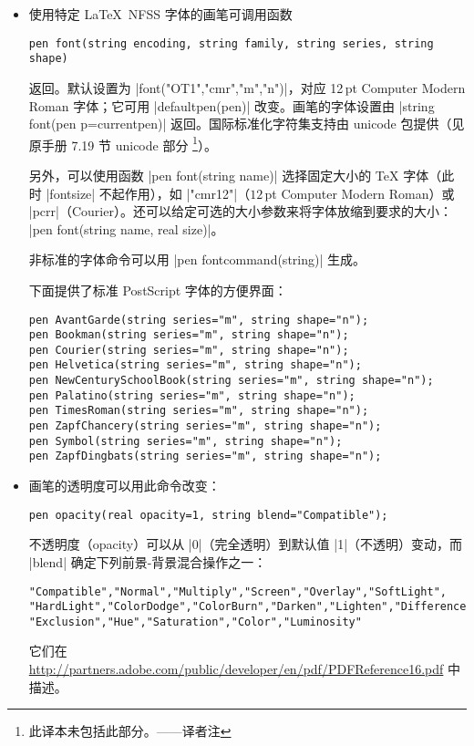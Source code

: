 \documentclass[nofonts,CJKnormalspaces]{ctexbook}[2009/05/20]
\newcommand*\prgname[1]{\textsf{#1}}
\newcommand\transnote[1]{\footnote{#1——译者注}}
\begin{document}
\begin{itemize}
\item 使用特定 \LaTeX\ NFSS 字体的画笔可调用函数
\begin{lstlisting}
pen font(string encoding, string family, string series, string shape)
\end{lstlisting}
  返回。默认设置为 |font("OT1","cmr","m","n")|，对应 12\,pt Computer Modern
  Roman 字体；它可用 |defaultpen(pen)| 改变。画笔的字体设置由
  |string font(pen p=currentpen)| 返回。国际标准化字符集支持由
  \prgname{unicode} 包提供（见原手册 7.19 节 \prgname{unicode} 部分%
  \transnote{此译本未包括此部分。}）。

  另外，可以使用函数 |pen font(string name)| 选择固定大小的 \TeX{} 字体（此时
  |fontsize| 不起作用），如 |"cmr12"|（$12$\,pt Computer Modern Roman）或
  |pcrr|（Courier）。还可以给定可选的大小参数来将字体放缩到要求的大小：
  |pen font(string name, real size)|。

  非标准的字体命令可以用 |pen fontcommand(string)| 生成。

  \index{PostScript 字体@\prgname{PostScript} 字体}
  下面提供了标准 \prgname{PostScript} 字体的方便界面：
\begin{lstlisting}
pen AvantGarde(string series="m", string shape="n");
pen Bookman(string series="m", string shape="n");
pen Courier(string series="m", string shape="n");
pen Helvetica(string series="m", string shape="n");
pen NewCenturySchoolBook(string series="m", string shape="n");
pen Palatino(string series="m", string shape="n");
pen TimesRoman(string series="m", string shape="n");
pen ZapfChancery(string series="m", string shape="n");
pen Symbol(string series="m", string shape="n");
pen ZapfDingbats(string series="m", string shape="n");
\end{lstlisting}

\item 画笔的透明度可以用此命令改变：
\begin{lstlisting}
pen opacity(real opacity=1, string blend="Compatible");
\end{lstlisting}
  不透明度（opacity）可以从 |0|（完全透明）到默认值 |1|（不透明）变动，而
  |blend| 确定下列前景-背景混合操作之一：
\begin{lstlisting}
"Compatible","Normal","Multiply","Screen","Overlay","SoftLight",
"HardLight","ColorDodge","ColorBurn","Darken","Lighten","Difference",
"Exclusion","Hue","Saturation","Color","Luminosity"
\end{lstlisting}
  它们在
\url{http://partners.adobe.com/public/developer/en/pdf/PDFReference16.pdf}
  中描述。


\end{itemize}
\end{document}
